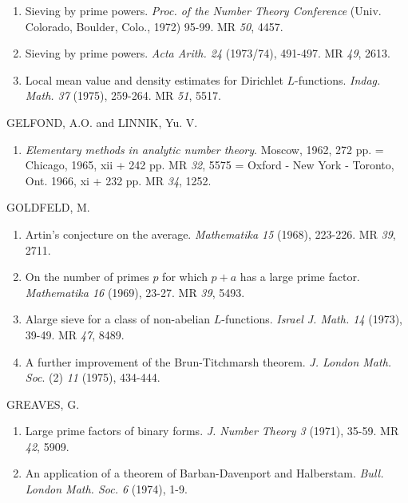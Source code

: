 \begin{thebibliography}{99}
\begin{enumerate}
\item Sieving by prime powers. \textit{Proc. of the Number Theory
  Conference} (Univ. Colorado, Boulder, Colo., 1972) 95-99. MR
  {\em 50}, 4457.

\item Sieving by prime powers. \textit{Acta Arith. 24}
  (1973/74), 491-497. MR {\em 49}, 2613.

\item Local mean value and density estimates for Dirichlet
  $L$-functions. \textit{Indag. Math. 37} (1975), 259-264. MR {\em
  51}, 5517.
\end{enumerate}

 GELFOND, A.O. and LINNIK, Yu. V.
\begin{enumerate}
\item {\em Elementary methods in analytic number theory}. Moscow,
  1962, 272 pp. = Chicago, 1965, xii + 242 pp. MR {\em 32}, 5575 =
  Oxford - New York - Toronto, Ont. 1966,  xi + 232 pp.  MR {\em 34},
  1252. 
\end{enumerate}

 GOLDFELD, M.
\begin{enumerate}
\item Artin's conjecture on the average. \textit{Mathematika 15}
  (1968), 223-226. MR {\em 39}, 2711.

\item On the number of primes $p$ for which $p+a$ has a large
  prime factor. \textit{Mathematika 16} (1969), 23-27. MR {\em 39},
  5493.  

\item A\pageoriginale large sieve for a class of non-abelian
  $L$-functions. \textit{Israel J. Math. 14} (1973), 39-49. MR
  {\em 47}, 8489. 

\item A further improvement of the Brun-Titchmarsh
  theorem. \textit{J. London Math. Soc}. (2) {\em 11} (1975), 434-444. 
\end{enumerate}

 GREAVES, G.
\begin{enumerate}
\item Large prime factors of binary forms. \textit{J. Number Theory 3}
  (1971), 35-59. MR {\em 42}, 5909.

\item An application of a theorem of Barban-Davenport and
  Halberstam. \textit{Bull. London Math. Soc. 6} (1974), 1-9.
\end{enumerate}


\end{thebibliography}
